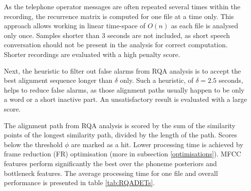 \documentclass{ExcelAtFIT}
\begin{document}
As the telephone operator messages are often repeated several times within the recording, the recurrence matrix is computed for one file at a time only. This approach allows working in linear time-space of $O(n)$ as each file is analysed only once. Samples shorter than 3 seconds are not included, as short speech conversation should not be present in the analysis for correct computation. Shorter recordings are evaluated with a high penalty score. 

Next, the heuristic to filter out false alarms from RQA analysis is to accept the best alignment sequence longer than $\delta$ only. Such a heuristic, of $\delta = 2.5$ seconds, helps to reduce false alarms, as those alignment paths usually happen to be only a word or a short inactive part. An unsatisfactory result is evaluated with a large score. 

The alignment path from RQA analysis is scored by the sum of the similarity points of the longest similarity path, divided by the length of the path. Scores below the threshold $\phi$ are marked as a hit. Lower processing time is achieved by frame reduction (FR) optimisation (more in subsection \ref{optimisations}). MFCC features perform significantly the best over the phoneme posteriors and bottleneck features. The average processing time for one file and overall performance is presented in table \ref{tab:RQADETs}.
\end{document}
